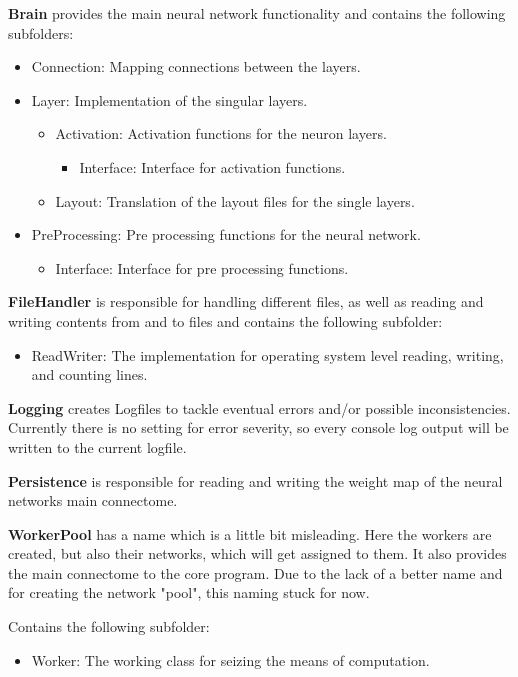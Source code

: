 \documentclass[11pt]{article}
\begin{document}
\textbf{Brain} provides the main neural network functionality and contains the following subfolders:
\begin{itemize}
\item Connection: Mapping connections between the layers.
\item Layer: Implementation of the singular layers.
\begin{itemize}
\item Activation: Activation functions for the neuron layers.
\begin{itemize}
\item Interface: Interface for activation functions.
\end{itemize}
\item Layout: Translation of the layout files for the single layers.
\end{itemize}
\item PreProcessing: Pre processing functions for the neural network.
\begin{itemize}
\item Interface: Interface for pre processing functions.
\end{itemize}
\end{itemize}

\textbf{FileHandler} is responsible for handling different files, as well as reading and writing contents from and to files and contains the following subfolder:
\begin{itemize}
\item ReadWriter: The implementation for operating system level reading, writing, and counting lines.
\end{itemize}

\textbf{Logging} creates Logfiles to tackle eventual errors and/or possible inconsistencies. Currently there is no setting for error severity, so every console log output will be written to the current logfile.

\textbf{Persistence} is responsible for reading and writing the weight map of the neural networks main connectome.

\textbf{WorkerPool} has a name which is a little bit misleading. Here the workers are created, but also their networks, which will get assigned to them. It also provides the main connectome to the core program. Due to the lack of a better name and for creating the network "pool", this naming stuck for now.

Contains the following subfolder:
\begin{itemize}
\item Worker: The working class for seizing the means of computation.
\end{itemize}
\end{document}
